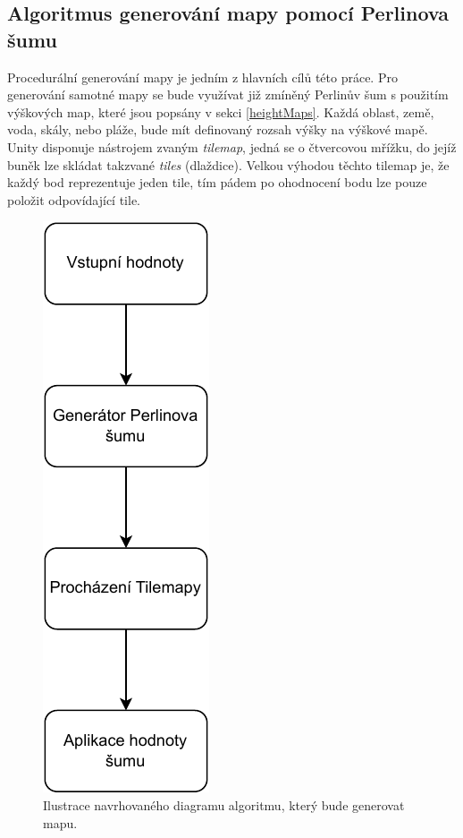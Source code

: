 \newpage
\subsection{Algoritmus generování mapy pomocí Perlinova šumu}
Procedurální generování mapy je jedním z hlavních cílů této práce. Pro generování samotné mapy se bude využívat již zmíněný Perlinův šum s použitím výškových map, které jsou popsány v sekci \ref{heightMaps}. Každá oblast, země, voda, skály, nebo pláže, bude mít definovaný rozsah výšky na výškové mapě. Unity disponuje nástrojem zvaným \textit{tilemap}, jedná se o čtvercovou mřížku, do jejíž buněk lze skládat takzvané \textit{tiles} (dlaždice). Velkou výhodou těchto tilemap je, že každý bod reprezentuje jeden tile, tím pádem po ohodnocení bodu lze pouze položit odpovídající tile.

\begin{figure}[H]
	\centering
	\includegraphics[scale=0.9]{obrazky-figures/generation.pdf}
	\caption{Ilustrace navrhovaného diagramu algoritmu, který bude generovat mapu.}
	\label{AlgoritmusDiagram}
\end{figure}

